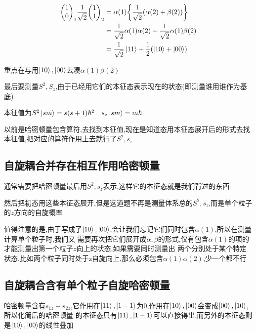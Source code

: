             \begin{align*}
                \mqty(1 \\ 0)_{1} \frac{1}{\sqrt{2}}\mqty(1 \\ 1)_{2} &= \alpha(1) \qty{ \frac{1}{\sqrt{2}} (\alpha(2) + \beta(2) ) } \\
                                                                      &= \frac{1}{\sqrt{2}} \alpha(1)\alpha(2) + \frac{1}{\sqrt{2}}\alpha(1)\beta(2)  \\
                                                                      &= \frac{1}{\sqrt{2}} \ket{11} + \frac{1}{2} (\ket{10} + \ket{00})
            \end{align*}
            
            重点在与用$\ket{10},\ket{00}$去凑$\alpha(1)\beta(2)$
            
            最后要测量$S^{2},S_{z}$,由于已经用它们的本征态表示现在的状态(即测量谁用谁作为基底)

            本征值为$S^{2} \ket{sm} = s(s+1)\hbar^{2} \quad s_{z}\ket{sm} = m\hbar $ 

            以前是哈密顿量包含算符,去找到本征值,现在是知道态用本征态展开后的形式去找本征值,把对应的算符作用上去就行了$S^{2},s_{z}$

        \subsection{自旋耦合并存在相互作用哈密顿量}
            通常需要把哈密顿量最后用$S^{2},s_{z}$表示,这样它的本征态就是我们背过的东西

            然后把初态用这些本征态展开,但是这道题不再是测量体系总的$S^{2},s_{z}$,而是单个粒子的$z$方向的自旋概率

            值得注意的是,由于写成了$\ket{10},\ket{00}$,会让我们忘记它们同时包含$\alpha(1)$,所以在测量计算单个粒子时,我们又
            需要再次把它们展开成$\alpha , \beta$的形式,仅有包含$\alpha(1)$的项的才能测量出第一个粒子$z$向上的状态,如果需要同时测量出
            两个分别处于某个特定状态,比如两个粒子同时处于z自旋向上,那么必须包含$\alpha(1)\alpha(2)$,少一个都不行


        \subsection{自旋耦合含有单个粒子自旋哈密顿量}
            哈密顿量含有$s_{1z}-s_{2z}$,它作用在$\ket{11},\ket{1-1}$为0,作用在$\ket{10},\ket{00}$会变成$\ket{00},\ket{10}$,所以化简后的哈密顿量
            的本征态只有$\ket{11},\ket{1-1}$可以直接得出,而另外的本征态则是$\ket{10},\ket{00}$的线性叠加

